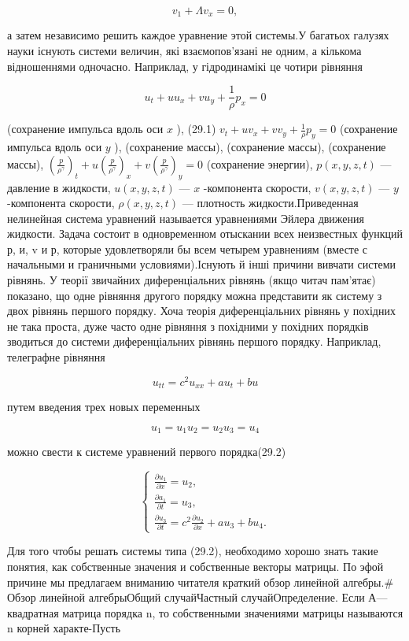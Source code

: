 \documentclass[
  ukrainian,
]{article}
\begin{document}
\[
v_1 + \Lambda v_x = 0,
\]

а затем независимо решить каждое уравнение этой системы.У багатьох
галузях науки існують системи величин, які взаємопов'язані не одним, а
кількома відношеннями одночасно. Наприклад, у гідродинамікі це чотири
рівняння

\[
u_t + uu_x + vu_y + \frac{1}{\rho} p_x = 0
\]

(сохранение импульса вдоль оси \(x\) ), (29.1)
\(v_t + uv_x + vv_y + \frac{1}{\rho} p_y = 0\) (сохранение импульса
вдоль оси \(y\) ), (сохранение массы), (сохранение массы), (сохранение
массы),
\(\left(\frac{p}{\rho^{\gamma}}\right)_t + u\left(\frac{p}{\rho^{\gamma}}\right)_x + v\left(\frac{p}{\rho^{\gamma}}\right)_y = 0\)
(сохранение энергии), \(p(x, y, z, t)\) --- давление в жидкости,
\(u(x, y, z, t)\) --- \(x\) -компонента скорости, \(v(x, y, z, t)\) ---
\(y\) -компонента скорости, \(\rho(x, y, z, t)\) --- плотность
жидкости.Приведенная нелинейная система уравнений называется уравнениями
Эйлера движения жидкости. Задача состоит в одновременном отыскании всех
неизвестных функций р, и, v и р, которые удовлетворяли бы всем четырем
уравнениям (вместе с начальными и граничными условиями).Існують й інші
причини вивчати системи рівнянь. У теорії звичайних диференціальних
рівнянь (якщо читач пам'ятає) показано, що одне рівняння другого порядку
можна представити як систему з двох рівнянь першого порядку. Хоча теорія
диференціальних рівнянь у похідних не така проста, дуже часто одне
рівняння з похідними у похідних порядків зводиться до системи
диференціальних рівнянь першого порядку. Наприклад, телеграфне рівняння

\[
u_{tt} = c^2 u_{xx} + a u_t + b u
\]

путем введения трех новых переменных

\[
u_1 = u_1
u_2 = u_2
u_3 = u_4
\]

можно свести к системе уравнений первого порядка(29.2)

\[
\begin{cases} \frac{\partial u_1}{\partial x} = u_2, \\ \frac{\partial a_1}{\partial t} = u_3, \\ \frac{\partial u_3}{\partial t} = c^2 \frac{\partial u_2}{\partial x} + au_3 + bu_4. \end{cases}
\]

Для того чтобы решать системы типа (29.2), необходимо хорошо знать такие
понятия, как собственные значения и собственные векторы матрицы. По эфой
причине мы предлагаем вниманию читателя краткий обзор линейной
алгебры.\# Обзор линейной алгебрыОбщий случайЧастный случайОпределение.
Если А---квадратная матрица порядка n, то собственными значениями
матрицы называются n корней характе-Пусть
\end{document}
